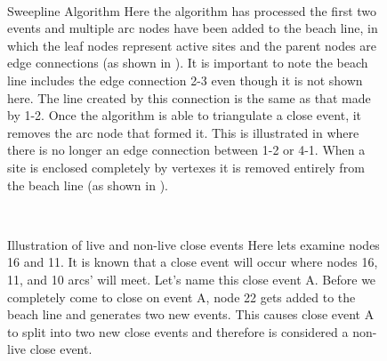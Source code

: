 \documentclass{egpubl}
\begin{document}
\begin{figure}
  \centering
   \\
  \caption{Sweepline Algorithm
    \protect{} Here the algorithm has processed the first two events and multiple arc nodes have been added to the beach line, in which the leaf nodes represent active sites and the parent nodes are edge connections (as shown in \protect{}). It is important to note the beach line includes the edge connection 2-3 even though it is not shown here. The line created by this connection is the same as that made by 1-2.
    \protect{} Once the algorithm is able to triangulate a close event, it removes the arc node that formed it. This is illustrated in \protect{} where there is no longer an edge connection between 1-2 or 4-1.
    \protect{} When a site is enclosed completely by vertexes it is removed entirely from the beach line (as shown in \protect{}).
  }
  \label{fig:sweepline}
\end{figure}


\begin{figure}
	\centering
	 \\
	\caption{Illustration of live and non-live close events 
		\protect{} Here lets examine nodes 16 and 11. It is known that a close event will occur where nodes 16, 11, and 10 arcs' will meet. Let's name this close event A.
		\protect{} Before we completely come to close on event A, node 22 gets added to the beach line and generates two new events. This causes  close event A to split into two new close events and therefore is considered a non-live close event. 
	}
	\label{fig:live_events}
\end{figure}
\end{document}
